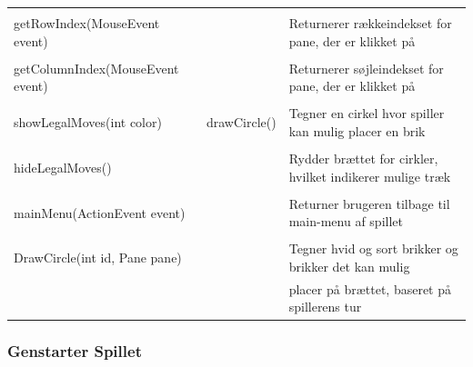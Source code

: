 \begin{table}[H]
\begin{tabular}{lll}
                                             &                 &                                                           \\
        getRowIndex(MouseEvent event)        &                 & Returnerer rækkeindekset for pane, der er klikket på      \\
                                             &                 &                                                           \\
        getColumnIndex(MouseEvent event)     &                 & Returnerer søjleindekset for pane, der er klikket på      \\
                                             &                 &                                                           \\
        showLegalMoves(int color)            & drawCircle()    & Tegner en cirkel hvor spiller kan mulig placer en brik    \\
                                             &                 &                                                           \\
        hideLegalMoves()                     &                 & Rydder brættet for cirkler, hvilket indikerer mulige træk \\
                                             &                 &                                                           \\
        mainMenu(ActionEvent event)          &                 & Returner brugeren tilbage til main-menu af spillet                 \\
        \\
        DrawCircle(int id, Pane pane) & & Tegner hvid og sort brikker og brikker det kan mulig  \\
                         & & placer på brættet, baseret på spillerens tur
                         \\         
        \bottomrule
    \end{tabular}
\end{table}

\subsubsection{Genstarter Spillet} \label{gs}

